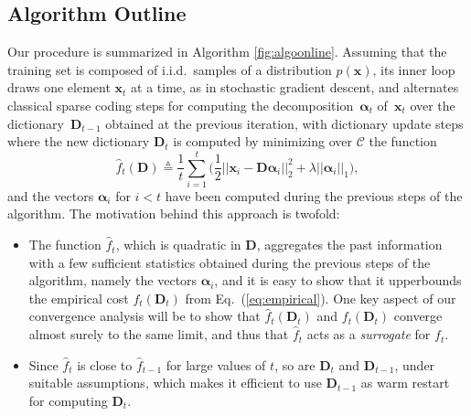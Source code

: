 \documentclass[twoside,11pt]{article}
\def\x{{\mathbf x}}
\def\hatf{{ \hat f}}
\def\alphab{{\boldsymbol\alpha}}
\def\D{{\mathbf D}}
\def\C{{\mathcal C}}
\def\hatf{{ \hat f}}
\def\defin{\stackrel{\vartriangle}{=}}
\begin{document}
\subsection{Algorithm Outline\label{sec:outline}}
Our procedure is summarized in Algorithm
\ref{fig:algoonline}. Assuming that the training set is composed of i.i.d.~samples 
of a distribution $p(\x)$, its inner loop draws one element $\x_t$ 
at a time, as in stochastic gradient descent, and alternates
classical sparse coding steps for computing the decomposition~$\alphab_t$
of~$\x_t$ over the dictionary~$\D_{t-1}$ obtained at the previous
iteration, with dictionary update steps where the new dictionary $\D_t$
is computed by minimizing over $\C$ the function
\begin{equation}
   \hatf_t(\D) \defin \frac{1}{t}\sum_{i=1}^t\Big(
   \frac{1}{2}||\x_i-\D\alphab_i||_2^2 + \lambda ||\alphab_i||_1\Big),
   \label{eq:surrog}
\end{equation}
and the vectors $\alphab_i$ for $i < t$ have been computed during the previous steps of
the algorithm.
The motivation behind this approach is twofold:
\begin{itemize}
   \item  The function $\hatf_t$, which is quadratic in $\D$, aggregates the
      past information with a few sufficient statistics obtained during the
previous steps of the algorithm, namely the vectors $\alphab_i$, and it is easy
to show that it upperbounds the empirical cost $f_t(\D_t)$ from
Eq.~(\ref{eq:empirical}). One key aspect of our convergence analysis will be to
show that $\hatf_t(\D_t)$ and $f_t(\D_t)$ converge almost surely to the same
limit, and thus that $\hatf_t$ acts as a {\em surrogate} for $f_t$. 
   \item Since $\hatf_t$ is close to $\hatf_{t-1}$ for large values of $t$, so are $\D_t$ and $\D_{t-1}$,
      under suitable assumptions,
      which makes it efficient to use $\D_{t-1}$ as warm restart for computing $\D_t$.
\end{itemize}
\end{document}

